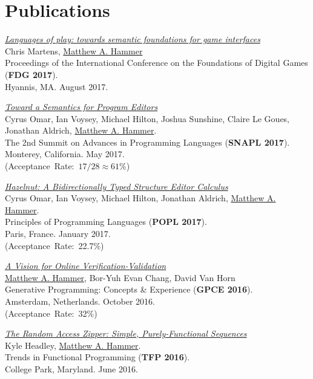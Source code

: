 \documentclass[10pt,letterpaper]{article}
\newcommand{\BeanCounter}[1]{(Acceptance~Rate:~#1\%)}
\renewenvironment{itemize}{
  \begin{list}{}{
    \setlength{\leftmargin}{1.5em}
    \setlength{\itemsep}{0.25em}
    \setlength{\parskip}{0pt}
    \setlength{\parsep}{0.25em}
  }
}{
  \end{list}
}
\begin{document}
\section*{Publications}
\begin{itemize}

\item
\href{https://arxiv.org/abs/1703.05410}
{\textit{Languages of play: towards semantic foundations for game interfaces}}
\\
Chris Martens, \underline{Matthew A. Hammer}
\\
Proceedings of the International Conference on the Foundations of Digital Games (\textbf{FDG 2017}).
\\
Hyannis, MA. August 2017.

\item
\href{http://hazelgrove.org/docs/hazel-vision-tr.pdf}{\textit{Toward a Semantics for Program Editors}}
\\
Cyrus Omar, Ian Voysey, Michael Hilton, Joshua Sunshine, Claire Le Goues, Jonathan Aldrich, \underline{Matthew A. Hammer}.
\\
The 2nd Summit on Advances in Programming Languages (\textbf{SNAPL 2017}).
\\
Monterey, California. May 2017.
\\
\BeanCounter{$17/28 \approx 61$}

\item
\href{https://arxiv.org/abs/1607.04180}{\textit{Hazelnut: A Bidirectionally Typed Structure Editor Calculus}}
\\
Cyrus Omar, Ian Voysey, Michael Hilton, Jonathan Aldrich, \underline{Matthew A. Hammer}.
\\
Principles of Programming Languages (\textbf{POPL 2017}).
\\
Paris, France. January 2017.
\\
\BeanCounter{22.7}

\item
\href{https://arxiv.org/abs/1608.06012}{\textit{A Vision for Online Verification-Validation}}
\\
\underline{Matthew A. Hammer}, Bor-Yuh Evan Chang, David Van Horn
\\
Generative Programming: Concepts \& Experience (\textbf{GPCE 2016}).
\\
Amsterdam, Netherlands. October 2016.
\\
\BeanCounter{32}

\item
\href{https://arxiv.org/abs/1608.06009}{\textit{The Random Access Zipper: Simple, Purely-Functional Sequences}}
\\
Kyle Headley, \underline{Matthew A. Hammer}.
\\
Trends in Functional Programming (\textbf{TFP 2016}).
\\
College Park, Maryland. June 2016. 


\end{itemize}
\end{document}
